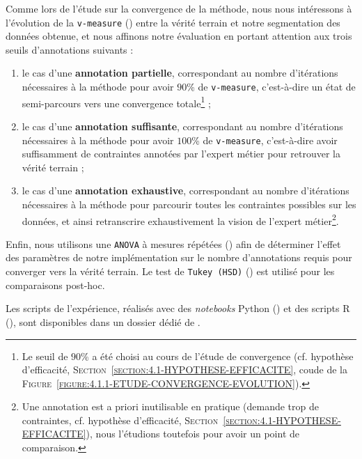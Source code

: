			Comme lors de l'étude sur la convergence de la méthode, nous nous intéressons à l'évolution de la \texttt{v-measure} (\cite{rosenberg-hirschberg:2007:vmeasure-conditional-entropybased}) entre la vérité terrain et notre segmentation des données obtenue, et nous affinons notre évaluation en portant attention aux trois seuils d'annotations suivants :
			\begin{enumerate}
				\item le cas d'une \textbf{annotation partielle}, correspondant au nombre d'itérations nécessaires à la méthode pour avoir $90$\% de \texttt{v-measure}, c'est-à-dire un état de semi-parcours vers une convergence totale\footnote{
					Le seuil de $90$\% a été choisi au cours de l'étude de convergence (cf. hypothèse d'efficacité, \textsc{Section~\ref{section:4.1-HYPOTHESE-EFFICACITE}}, coude de la \textsc{Figure~\ref{figure:4.1.1-ETUDE-CONVERGENCE-EVOLUTION}}).
				} ;
				\item le cas d'une \textbf{annotation suffisante}, correspondant au nombre d'itérations nécessaires à la méthode pour avoir $100$\% de \texttt{v-measure}, c'est-à-dire avoir suffisamment de contraintes annotées par l'expert métier pour retrouver la vérité terrain ;
				\item le cas d'une \textbf{annotation exhaustive}, correspondant au nombre d'itérations nécessaires à la méthode pour parcourir toutes les contraintes possibles sur les données, et ainsi retranscrire exhaustivement la vision de l'expert métier\footnote{
					Une annotation est a priori inutilisable en pratique (demande trop de contraintes, cf. hypothèse d'efficacité, \textsc{Section~\ref{section:4.1-HYPOTHESE-EFFICACITE}}), nous l'étudions toutefois pour avoir un point de comparaison.
				}.
			\end{enumerate}
			
			Enfin, nous utilisons une \texttt{ANOVA} à mesures répétées (\cite{girden:1992:anova}) afin de déterminer l'effet des paramètres de notre implémentation sur le nombre d'annotations requis pour converger vers la vérité terrain. Le test de \texttt{Tukey (HSD)} (\cite{tukey:1949:comparing-individual-means}) est utilisé pour les comparaisons post-hoc.
			
			\begin{leftBarInformation}
				Les scripts de l'expérience, réalisés avec des \textit{notebooks} Python (\cite{van-rossum-drake:2009:python-reference-manual}) et des scripts R (\cite{r-core-team:2017:language-environment-statistical}), sont disponibles dans un dossier dédié de \cite{schild:2021:cognitivefactory-interactiveclusteringcomparativestudy}.
			\end{leftBarInformation}


